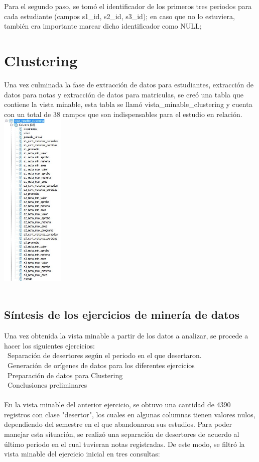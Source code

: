 \documentclass[fleqn,10pt]{SelfArx} %
\begin{document}
Para el segundo paso, se tomó el identificador de los primeros tres periodos para cada estudiante (campos s1\_id, s2\_id, s3\_id); en caso que no lo estuviera, también era importante marcar dicho identificador como NULL;

\section{Clustering}

Una vez culminada la fase de extracción de datos para estudiantes, extracción de datos para notas y extracción de datos para matriculas, se creó una tabla que contiene la vista minable, esta tabla se llamó vista\_minable\_clustering y cuenta con un total de 38 campos que son indispensables para el estudio en relación.\\

\includegraphics[width=3cm]{img/captura.jpg}\\ 
\\

\subsection{Síntesis de los ejercicios de minería de datos} 

Una vez obtenida la vista minable a partir de los datos a analizar, se procede a hacer los siguientes ejercicios:\\
\textbullet\ Separación de desertores según el periodo en el que desertaron.\\
\textbullet\ Generación de orígenes de datos para los diferentes ejercicios\\
\textbullet\ Preparación de datos para Clustering\\
\textbullet\ Conclusiones preliminares\\
\\
En la vista minable del anterior ejercicio, se obtuvo una cantidad de 4390 registros con clase "desertor", los cuales en algunas columnas tienen valores nulos, dependiendo del semestre en el que abandonaron sus estudios. Para poder manejar esta situación, se realizó una separación de desertores de acuerdo al último periodo en el cual tuvieran notas registradas. De este modo, se filtró la vista minable del ejercicio inicial en tres consultas:\\
\end{document}
